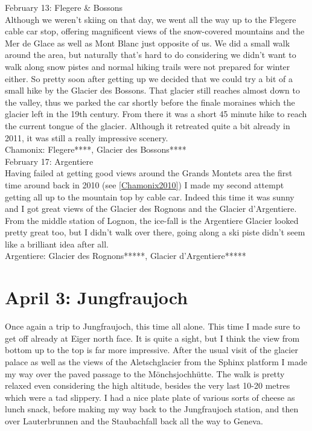 February 13: Flegere \& Bossons\\
Although we weren't skiing on that day, we went all the way up to the Flegere cable car stop, offering magnificent views of the snow-covered mountains and the Mer de Glace as well as Mont Blanc just opposite of us. We did a small walk around the area, but naturally that's hard to do considering we didn't want to walk along snow pistes and normal hiking trails were not prepared for winter either. So pretty soon after getting up we decided that we could try a bit of a small hike by the Glacier des Bossons. That glacier still reaches almost down to the valley, thus we parked the car shortly before the finale moraines which the glacier left in the 19th century. From there it was a short 45 minute hike to reach the current tongue of the glacier. Although it retreated quite a bit already in 2011, it was still a really impressive scenery.\\

Chamonix: Flegere****, Glacier des Bossons****\\

February 17: Argentiere\\
Having failed at getting good views around the Grands Montets area the first time around back in 2010 (see \ref{Chamonix2010}) I made my second attempt getting all up to the mountain top by cable car. Indeed this time it was sunny and I got great views of the Glacier des Rognons and the Glacier d'Argentiere. From the middle station of Lognon, the ice-fall is the Argentiere Glacier looked pretty great too, but I didn't walk over there, going along a ski piste didn't seem like a brilliant idea after all.\\

Argentiere: Glacier des Rognons*****, Glacier d'Argentiere*****\\

\section{April 3: Jungfraujoch}
\label{Jungfrau2011}

Once again a trip to Jungfraujoch, this time all alone. This time I made sure to get off already at Eiger north face. It is quite a sight, but I think the view from bottom up to the top is far more impressive. After the usual visit of the glacier palace as well as the views of the Aletschglacier from the Sphinx platform I made my way over the paved passage to the M\"onchsjochh\"utte. The walk is pretty relaxed even considering the high altitude, besides the very last 10-20 metres which were a tad slippery. I had a nice plate plate of various sorts of cheese as lunch snack, before making my way back to the Jungfraujoch station, and then over Lauterbrunnen and the Staubachfall back all the way to Geneva.\\

